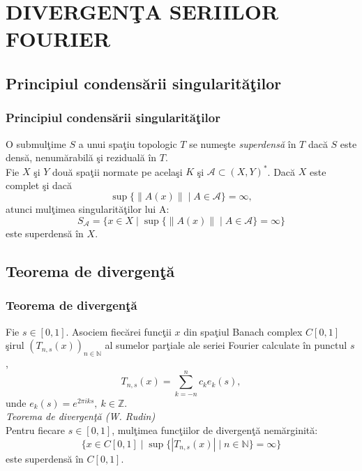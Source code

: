 \documentclass{beamer}
\begin{document}
\section{DIVERGEN\c TA SERIILOR FOURIER}
\begin{frame}
\subsection{Principiul condens\u arii singularit\u a\c tilor}
\frametitle{Principiul condens\u arii singularit\u a\c tilor}
\hspace*{20pt}O submul\c time $S$ a unui spa\c tiu topologic $T$ se nume\c ste \textit{superdens\u a} \^ in $T$ dac\u a $S$ este dens\u a, nenum\u arabil\u a \c si rezidual\u a \^ in $T$.\\
\hspace*{20pt}Fie $X$ \c si $Y$ dou\u a spa\c tii normate pe acela\c si $K$ \c si $\mathcal{A} \subset (X, Y)^*$. Dac\u a $X$ este complet \c si dac\u a 
\begin{equation*}
\sup\{\|A(x)\| \mid A \in \mathcal{A}\} = \infty,
\end{equation*}atunci mul\c timea singularit\u a\c tilor lui A:
\begin{equation*}
S_{\mathcal{A}} = \big\{x \in X \mid \sup\{\|A(x)\| \mid A \in \mathcal{A}\} = \infty\big\}
\end{equation*} 
este superdens\u a \^ in $X$.
\end{frame}


\begin{frame}
\subsection{Teorema de divergen\c t\u a}
\frametitle{Teorema de divergen\c t\u a}
\hspace*{20pt}Fie $s\in[0,1]$. Asociem fiec\u arei func\c tii $x$ din spa\c tiul Banach complex $C[0,1]$ \c sirul $(T_{n,s}(x))_{n\in \mathbb{N}}$ al sumelor par\c tiale ale seriei Fourier calculate \^ in punctul $s$,
\begin{equation*}
T_{n,s}(x)= \sum_{k=-n}^{n}c_ke_k(s),
\end{equation*}
unde $e_k(s)=e^{2\pi iks}, \: k\in \mathbb{Z}$.\\
\hspace*{20pt}\textit{Teorema de divergen\c t\u a (W. Rudin)}\\
\hspace*{20pt}Pentru fiecare $s \in [0,1]$, mul\c timea func\c tiilor de divergen\c t\u a  nem\u arginit\u a:
\begin{equation*}
\Big\{x \in C[0,1] \mid \sup \{\left|T_{n,s}(x) \right|\mid n \in \mathbb{N}\} = \infty \Big\}
\end{equation*}
este superdens\u a \^ in $C[0,1]$.
\end{frame}
\end{document}
